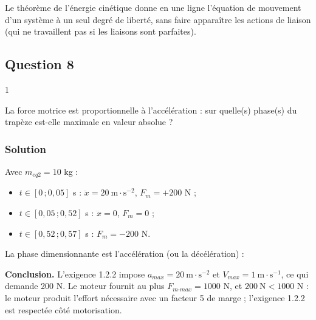 \documentclass[11pt,a4paper]{article}
\providecommand{\tightlist}{\setlength{\itemsep}{0pt}\setlength{\parskip}{0pt}}
\newcommand{\equationajustee}[1]{%
  \sbox{\boiteequation}{$\displaystyle #1$}%
  \ifdim\wd\boiteequation>\linewidth
    \[\resizebox{\linewidth}{!}{\usebox{\boiteequation}}\]%
  \else
    \[#1\]%
  \fi}
\begin{document}
\begin{methode}

Le théorème de l'énergie cinétique donne en une ligne l'équation de mouvement d'un système à un seul degré de liberté, sans faire apparaître les actions de liaison (qui ne travaillent pas si les liaisons sont parfaites).

\end{methode}

\hypertarget{question-8}{%
\subsection{Question 8}\label{question-8}}

\begin{indication}{1}

La force motrice est proportionnelle à l'accélération : sur quelle(s) phase(s) du trapèze est-elle maximale en valeur absolue ?

\end{indication}

\hypertarget{solution-7}{%
\subsubsection{Solution}\label{solution-7}}

Avec \(m_{eq2}=10\) kg :

\begin{itemize}
\tightlist
\item
  \(t\in[0\,;0{,}05]\) s : \(\ddot x=20\ \mathrm{m\cdot s^{-2}}\), \(F_m=+200\) N ;
\item
  \(t\in[0{,}05\,;0{,}52]\) s : \(\ddot x=0\), \(F_m=0\) ;
\item
  \(t\in[0{,}52\,;0{,}57]\) s : \(F_m=-200\) N.
\end{itemize}

La phase dimensionnante est l'accélération (ou la décélération) :

\equationajustee{
\begin{aligned}
|F_m|_{max}&=m_{eq2}\,a_{max}\\
&=\boxed{200\ \text{N}}
\end{aligned}
}

\textbf{Conclusion.} L'exigence 1.2.2 impose \(a_{max}=20\ \mathrm{m\cdot s^{-2}}\) et \(V_{max}=1\ \mathrm{m\cdot s^{-1}}\), ce qui demande 200 N. Le moteur fournit au plus \(F_{m\text{-}max}=1000\) N, et \(200\ \text{N}<1000\) N : le moteur produit l'effort nécessaire avec un facteur 5 de marge ; l'exigence 1.2.2 est respectée côté motorisation.
\end{document}
